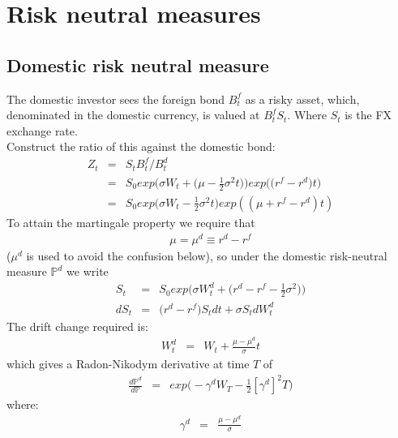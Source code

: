 \chapter{Risk neutral measures}

\section{Domestic risk neutral measure}
The domestic investor sees the foreign bond $B_{t}^{f}$ as a risky asset, which, denominated in the domestic currency, is valued at $B_{t}^{f}S_{t}$. Where $S_{t}$ is the FX exchange rate.\\
Construct the ratio of this against the domestic bond:
\begin{eqnarray}
	\nonumber
	Z_{t} &=& S_{t}B_{t}^{f} / B_{t}^{d}\\
	\nonumber
	  &=& S_{0}exp\bigg(\sigma W_{t} + \bigg(\mu -\frac{1}{2}\sigma^{2}t\bigg)\bigg)exp\bigg(\bigg(r^{f} - r^{d}\bigg)t\bigg)\\
	  &=& S_{0}exp\bigg(\sigma W_{t} - \frac{1}{2}\sigma^{2}t\bigg)exp((\mu + r^{f} - r^{d})t)
\end{eqnarray}
To attain the martingale property we require that
\begin{eqnarray}
\mu = \mu^{d} \equiv r^{d} - r^{f}
\end{eqnarray}
($\mu^{d}$ is used to avoid the confusion below), so under the domestic risk-neutral measure $\mathbb{P}^{d}$ we write
\begin{eqnarray}
	S_{t} &=& S_{0}exp\bigg(\sigma W_{t}^{d} + \bigg(r^{d} - r^{f} - \frac{1}{2}\sigma^{2}\bigg)\bigg)\\
	dS_{t} &=& \bigg(r^{d} - r^{f}\bigg)S_{t}dt + \sigma S_{t}dW_{t}^{d}
\end{eqnarray}
The drift change required is:
\begin{eqnarray}
	W_{t}^{d} &=& W_{t} + \frac{\mu - \mu^{d}}{\sigma}t
\end{eqnarray}
which gives a Radon-Nikodym derivative at time $T$ of
\begin{eqnarray}
\frac{d\mathbb{P}^{d}}{d\mathbb{P}} &=& exp\bigg(-\gamma^{d}W_{T} - \frac{1}{2}[\gamma^{d}]^{2}T\bigg)
\end{eqnarray}
where:
\begin{eqnarray}
\gamma^{d} &=& \frac{\mu - \mu^{d}}{\sigma}
\end{eqnarray}

